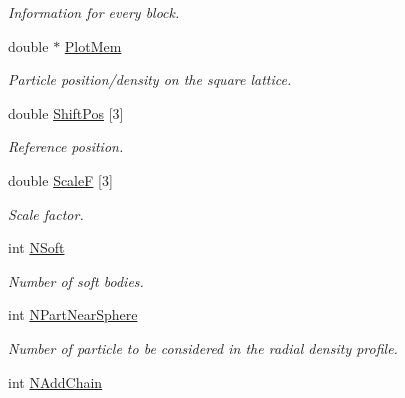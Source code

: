 \begin{DoxyCompactItemize}
\begin{DoxyCompactList}\small\item\em \-Information for every block. \end{DoxyCompactList}\item 
\hypertarget{classVarData_ac5723b66cbed09bdf120939a3434165a}{double $\ast$ \hyperlink{classVarData_ac5723b66cbed09bdf120939a3434165a}{\-Plot\-Mem}}\label{classVarData_ac5723b66cbed09bdf120939a3434165a}

\begin{DoxyCompactList}\small\item\em \-Particle position/density on the square lattice. \end{DoxyCompactList}\item 
\hypertarget{classVarData_aa2dd0176f89991418fa38a24db3f3381}{double \hyperlink{classVarData_aa2dd0176f89991418fa38a24db3f3381}{\-Shift\-Pos} \mbox{[}3\mbox{]}}\label{classVarData_aa2dd0176f89991418fa38a24db3f3381}

\begin{DoxyCompactList}\small\item\em \-Reference position. \end{DoxyCompactList}\item 
\hypertarget{classVarData_a4666508bbc27ca92b693e20b16098f5a}{double \hyperlink{classVarData_a4666508bbc27ca92b693e20b16098f5a}{\-Scale\-F} \mbox{[}3\mbox{]}}\label{classVarData_a4666508bbc27ca92b693e20b16098f5a}

\begin{DoxyCompactList}\small\item\em \-Scale factor. \end{DoxyCompactList}\item 
\hypertarget{classVarData_ae0d12816cef7153d2571b58556787c41}{int \hyperlink{classVarData_ae0d12816cef7153d2571b58556787c41}{\-N\-Soft}}\label{classVarData_ae0d12816cef7153d2571b58556787c41}

\begin{DoxyCompactList}\small\item\em \-Number of soft bodies. \end{DoxyCompactList}\item 
\hypertarget{classVarData_a03ba725564e3ec3787c04a1bf5f33205}{int \hyperlink{classVarData_a03ba725564e3ec3787c04a1bf5f33205}{\-N\-Part\-Near\-Sphere}}\label{classVarData_a03ba725564e3ec3787c04a1bf5f33205}

\begin{DoxyCompactList}\small\item\em \-Number of particle to be considered in the radial density profile. \end{DoxyCompactList}\item 
\hypertarget{classVarData_a0c86b9608b9e1386759ad483130f8b34}{int \hyperlink{classVarData_a0c86b9608b9e1386759ad483130f8b34}{\-N\-Add\-Chain}}\label{classVarData_a0c86b9608b9e1386759ad483130f8b34}


\end{DoxyCompactItemize}
